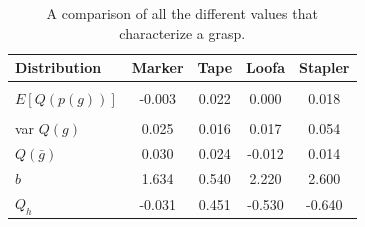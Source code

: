 \documentclass[letterpaper, 10 pt, conference]{ieeeconf}  %
\begin{document}
\begin{table}[ht!]
        \begin{tabular}{ l | c c c c}
         Distribution & \bf Marker & \bf Tape & \bf Loofa & \bf Stapler \\ 
        \hline \\
        $E[Q(p(g))]$ & -0.003 & 0.022 & 0.000 &  0.018\\
        \hline \\
        var $Q(g)$ & 0.025 & 0.016 & 0.017 &  0.054\\
        \hline 
        $Q(\bar{g})$ & 0.030 & 0.024 & -0.012 & 0.014\\
        \hline 
        $b$ & 1.634 & 0.540 & 2.220 & 2.600 \\
        \hline 
        $Q_h$ & -0.031 & 0.451 & -0.530 & -0.640 \\
        \hline 
        \end{tabular}
        \caption{A comparison of all the different values that characterize a grasp.}
		
\vspace*{-20pt}
\end{table}



\end{document}
